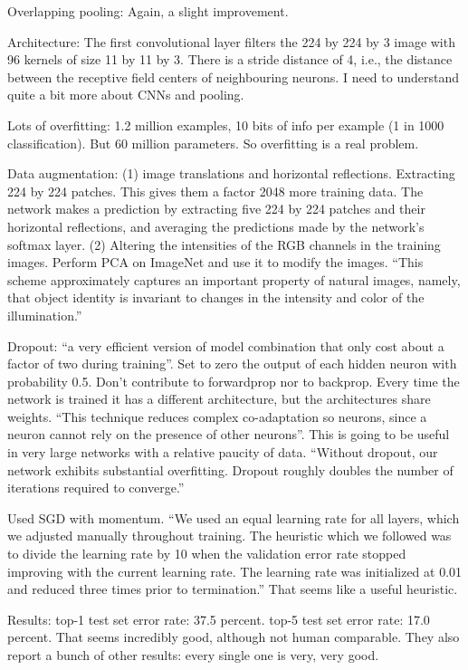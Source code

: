 \documentclass[12pt]{article}
\begin{document}
Overlapping pooling: Again, a slight improvement.

Architecture: The first convolutional layer filters the 224 by 224 by
3 image with 96 kernels of size 11 by 11 by 3.  There is a stride
distance of 4, i.e., the distance between the receptive field centers
of neighbouring neurons.  I need to understand quite a bit more about
CNNs and pooling.

Lots of overfitting: 1.2 million examples, 10 bits of info per example
(1 in 1000 classification).  But 60 million parameters.  So
overfitting is a real problem.

Data augmentation: (1) image translations and horizontal reflections.
Extracting 224 by 224 patches.  This gives them a factor 2048 more
training data.  The network makes a prediction by extracting five 224
by 224 patches and their horizontal reflections, and averaging the
predictions made by the network's softmax layer. (2) Altering the
intensities of the RGB channels in the training images.  Perform PCA
on ImageNet and use it to modify the images.  ``This scheme
approximately captures an important property of natural images,
namely, that object identity is invariant to changes in the intensity
and color of the illumination.'' 

Dropout: ``a very efficient version of model combination that only
cost about a factor of two during training''.  Set to zero the output
of each hidden neuron with probability 0.5.  Don't contribute to
forwardprop nor to backprop.  Every time the network is trained it has
a different architecture, but the architectures share weights.  ``This
technique reduces complex co-adaptation so neurons, since a neuron
cannot rely on the presence of other neurons''.  This is going to be
useful in very large networks with a relative paucity of data.
``Without dropout, our network exhibits substantial overfitting.
Dropout roughly doubles the number of iterations required to
converge.''

Used SGD with momentum.  ``We used an equal learning rate for all
layers, which we adjusted manually throughout training.  The heuristic
which we followed was to divide the learning rate by 10 when the
validation error rate stopped improving with the current learning
rate.  The learning rate was initialized at 0.01 and reduced three
times prior to termination.''   That seems like a useful heuristic.

Results: top-1 test set error rate: 37.5 percent.  top-5 test set
error rate: 17.0 percent.  That seems incredibly good, although not
human comparable.  They also report a bunch of other results: every
single one is very, very good.
\end{document}
